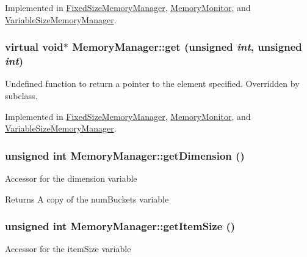 Implemented in \hyperlink{classFixedSizeMemoryManager_afad762c113d7a31766d3bff489ede569}{FixedSizeMemoryManager}, \hyperlink{classMemoryMonitor_a6ebe27bc008fb68397d9f400c0745c5d}{MemoryMonitor}, and \hyperlink{classVariableSizeMemoryManager_a7fca71f5a112a22d52a8ebf7ce4984a5}{VariableSizeMemoryManager}.

\hypertarget{classMemoryManager_ad1786ab026c6077405e3c963e05d4a26}{
\subsubsection[{get}]{\setlength{\rightskip}{0pt plus 5cm}virtual void$\ast$ MemoryManager::get (unsigned {\em int}, \/  unsigned {\em int})}}
\label{classMemoryManager_ad1786ab026c6077405e3c963e05d4a26}
Undefined function to return a pointer to the element specified. Overridden by subclass. 

Implemented in \hyperlink{classFixedSizeMemoryManager_a25a2676e266db960adffab1630323e70}{FixedSizeMemoryManager}, \hyperlink{classMemoryMonitor_a547ef93f8d1664f7f4a5c41f4a922caa}{MemoryMonitor}, and \hyperlink{classVariableSizeMemoryManager_a9be29ac3fbaba3824820d6d9a6e81243}{VariableSizeMemoryManager}.

\hypertarget{classMemoryManager_a1ee0a507083f71a998f4b5183e34e694}{
\subsubsection[{getDimension}]{\setlength{\rightskip}{0pt plus 5cm}unsigned int MemoryManager::getDimension ()}}
\label{classMemoryManager_a1ee0a507083f71a998f4b5183e34e694}
Accessor for the dimension variable

\begin{DoxyReturn}{Returns}
A copy of the numBuckets variable 
\end{DoxyReturn}
\hypertarget{classMemoryManager_a0a2a789513ac6d8349cfa536e2257330}{
\subsubsection[{getItemSize}]{\setlength{\rightskip}{0pt plus 5cm}unsigned int MemoryManager::getItemSize ()}}
\label{classMemoryManager_a0a2a789513ac6d8349cfa536e2257330}
Accessor for the itemSize variable

